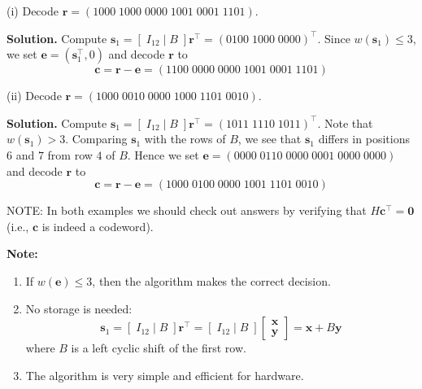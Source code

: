\begin{exbox}
    \begin{example}
        $ \; $

        (i) Decode $ \bm{r}=(1000\; 1000\; 0000\; 1001\; 0001\; 1101) $.

        \textbf{Solution.} Compute $ \bm{s}_1=\left[ \; I_{12}\mid B \; \right]\bm{r}^\top=
            (0100\; 1000\; 0000)^\top $. Since $ w(\bm{s}_1)\leqslant 3 $, we set
        $ \bm{e}=(\bm{s}_1^\top,0) $ and decode $ \bm{r} $ to
        \[ \bm{c}=\bm{r}-\bm{e}=(1100\; 0000\; 0000\; 1001\; 0001\; 1101) \]

        (ii) Decode $ \bm{r}=(1000\; 0010\; 0000\; 1000\; 1101\; 0010) $.

        \textbf{Solution.} Compute $ \bm{s}_1=\left[ \; I_{12}\mid B \; \right]\bm{r}^\top=
            (1011\; 1110\; 1011)^\top $. Note that $ w(\bm{s}_1)>3 $. Comparing $ \bm{s}_1 $
        with the rows of $ B $, we see that $ \bm{s}_1 $ differs in positions $ 6 $
        and $ 7 $ from row $ 4 $ of $ B $. Hence we set $ \bm{e}=(0000\; 0110\; 0000\; 0001\; 0000\; 0000) $
        and decode $ \bm{r} $ to
        \[ \bm{c}=\bm{r}-\bm{e}=(1000\; 0100\; 0000\; 1001\; 1101\; 0010) \]

        NOTE\@: In both examples we should check out answers by verifying that $ H\bm{c}^\top=\bm{0} $
        (i.e., $ \bm{c} $ is indeed a codeword).
    \end{example}
\end{exbox}

\textbf{Note:}
\begin{enumerate}[label=(\arabic*)]
    \item If $ w(\bm{e})\leqslant 3 $, then the algorithm makes the correct decision.
    \item No storage is needed:
          \[ \bm{s}_1=\left[ \; I_{12}\mid B\; \right]\bm{r}^\top=\left[ \; I_{12}\mid B\; \right]
              \begin{bmatrix}
                  \bm{x} \\
                  \bm{y}
              \end{bmatrix}=\bm{x}+B\bm{y} \]
          where $ B $ is a left cyclic shift of the first row.
    \item The algorithm is very simple and efficient for hardware.
\end{enumerate}


